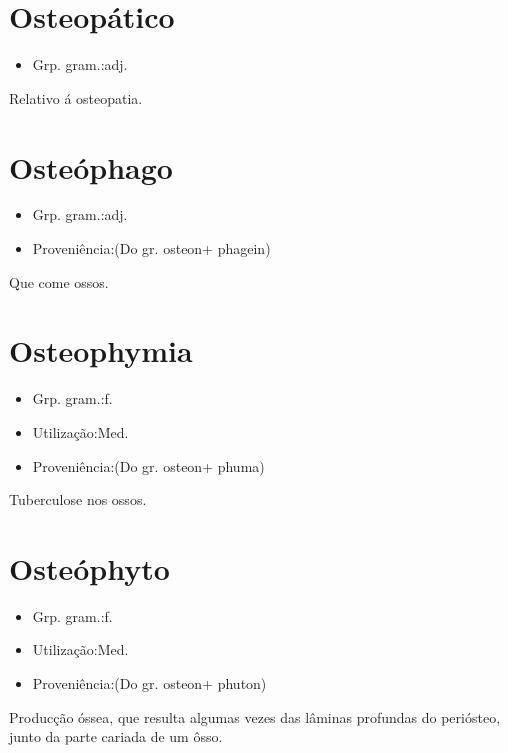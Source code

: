 \section{Osteopático}
\begin{itemize}
\item {Grp. gram.:adj.}
\end{itemize}
Relativo á osteopatia.
\section{Osteóphago}
\begin{itemize}
\item {Grp. gram.:adj.}
\end{itemize}
\begin{itemize}
\item {Proveniência:(Do gr. \textunderscore osteon\textunderscore  + \textunderscore phagein\textunderscore )}
\end{itemize}
Que come ossos.
\section{Osteophymia}
\begin{itemize}
\item {Grp. gram.:f.}
\end{itemize}
\begin{itemize}
\item {Utilização:Med.}
\end{itemize}
\begin{itemize}
\item {Proveniência:(Do gr. \textunderscore osteon\textunderscore  + \textunderscore phuma\textunderscore )}
\end{itemize}
Tuberculose nos ossos.
\section{Osteóphyto}
\begin{itemize}
\item {Grp. gram.:f.}
\end{itemize}
\begin{itemize}
\item {Utilização:Med.}
\end{itemize}
\begin{itemize}
\item {Proveniência:(Do gr. \textunderscore osteon\textunderscore  + \textunderscore phuton\textunderscore )}
\end{itemize}
Producção óssea, que resulta algumas vezes das lâminas profundas do periósteo, junto da parte cariada de um ôsso.
